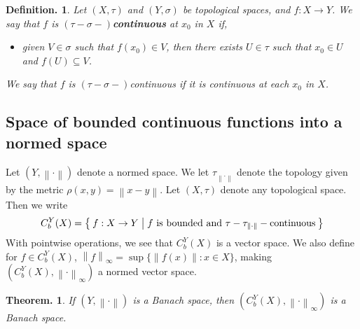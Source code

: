 \documentclass[11pt, a4paper]{memoir}
\newcommand{\norm}[1]{\ensuremath{\left\lVert#1\right\rVert}}
\theoremstyle{change}
\newtheorem{theorem}{Theorem.}[section]
\theoremstyle{plain}
\theoremstyle{nonumberplain}
\newtheorem{definition}{Definition.}
\numberwithin{equation}{section}
\begin{document}
\begin{definition}
    Let $(X,\tau)$ and $(Y,\sigma)$ be topological spaces, and $f:X\to Y$.
    We say that $f$ is \textbf{$(\tau-\sigma-)$continuous} at $x_0$ in $X$ if,
    \begin{itemize}
        \item given $V\in\sigma$ such that $f(x_0)\in V$, then there exists $U\in\tau$ such that $x_0\in U$ and $f(U)\subseteq V$.
    \end{itemize}
    We say that $f$ is $(\tau-\sigma-)$continuous if it is continuous at each $x_0$ in $X$.
\end{definition}
\subsection{Space of bounded continuous functions into a normed space}
Let $(Y,\norm{\cdot})$ denote a normed space.
We let $\tau_{\norm{\cdot}}$ denote the topology given by the metric $\rho(x,y)=\norm{x-y}$.
Let $(X,\tau)$ denote any topological space.
Then we write
\begin{equation*}
    C_b^Y(X) = \Set{f:X\to Y | f\text{ is bounded  and }\tau-\tau_{\norm{\cdot}}-\text{continuous}}
\end{equation*}
With pointwise operations, we see that $C_b^Y(X)$ is a vector space.
We also define for $f\in C_b^Y(X)$, $\norm{f}_\infty=\sup\{\norm{f(x)}:x\in X\}$, making $(C_b^Y(X),\norm{\cdot}_\infty)$ a normed vector space.
\begin{theorem}
    If $(Y,\norm{\cdot})$ is a Banach space, then $(C_b^Y(X),\norm{\cdot}_\infty)$ is a Banach space.
\end{theorem}
\end{document}
